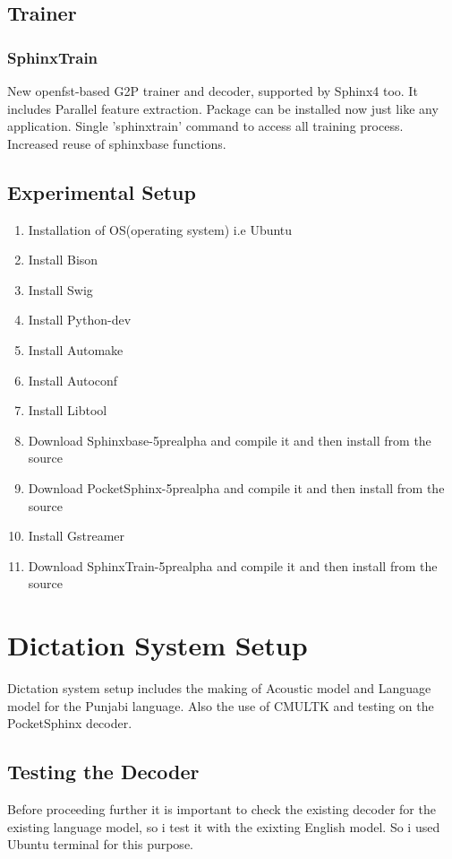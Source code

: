 \documentclass[12pt,a4paper,oldfontcommands]{memoir}
\begin{document}
\subsection{Trainer}
\subsubsection{SphinxTrain}
 New openfst-based G2P trainer and decoder, supported by Sphinx4 too. It includes Parallel feature extraction.  Package can be installed now just like any application. Single 'sphinxtrain' command to access all training process. Increased reuse of sphinxbase functions\cite{15}.

\subsection{Experimental Setup}

\begin{enumerate}
  \item Installation of OS(operating system) i.e Ubuntu
  \item Install Bison 
  \item Install Swig
  \item Install Python-dev
  \item Install Automake 
  \item Install Autoconf
  \item Install Libtool
  \item Download Sphinxbase-5prealpha and compile it and then install from the source
  \item Download PocketSphinx-5prealpha and compile it and then install from the source
  \item Install Gstreamer  
  \item Download SphinxTrain-5prealpha and compile it and then install from the source	
\end{enumerate}

\section{Dictation System Setup}
Dictation system setup includes the making of Acoustic model and Language model for the Punjabi language. Also the use of CMULTK and testing on the PocketSphinx decoder.

\subsection{Testing the Decoder}
Before proceeding further it is important to check the existing decoder for the existing language model, so i test it with the exixting English model.
So i used Ubuntu terminal for this purpose.\\ 
\end{document}
